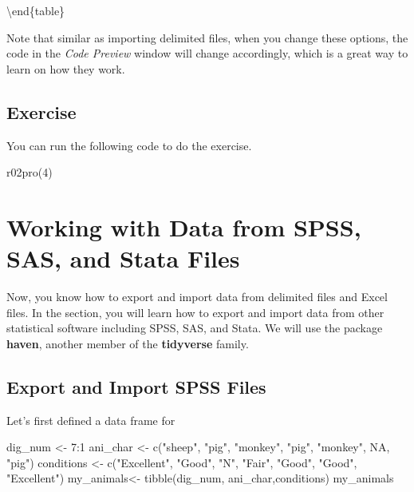 \documentclass[
]{book}
\newenvironment{Shaded}{\begin{snugshade}}{\end{snugshade}}
\newcommand{\ConstantTok}[1]{\textcolor[rgb]{0.00,0.00,0.00}{#1}}
\newcommand{\DecValTok}[1]{\textcolor[rgb]{0.00,0.00,0.81}{#1}}
\newcommand{\FunctionTok}[1]{\textcolor[rgb]{0.00,0.00,0.00}{#1}}
\newcommand{\NormalTok}[1]{#1}
\newcommand{\OtherTok}[1]{\textcolor[rgb]{0.56,0.35,0.01}{#1}}
\newcommand{\SpecialCharTok}[1]{\textcolor[rgb]{0.00,0.00,0.00}{#1}}
\newcommand{\StringTok}[1]{\textcolor[rgb]{0.31,0.60,0.02}{#1}}
\begin{document}
\textbackslash end\{table\}

Note that similar as importing delimited files, when you change these options, the code in the \emph{Code Preview} window will change accordingly, which is a great way to learn on how they work.

\hypertarget{exercise}{%
\subsection{Exercise}\label{exercise}}

You can run the following code to do the exercise.

\begin{Shaded}
\begin{Highlighting}[]
\FunctionTok{r02pro}\NormalTok{(}\DecValTok{4}\NormalTok{)}
\end{Highlighting}
\end{Shaded}

\hypertarget{import-other}{%
\section{Working with Data from SPSS, SAS, and Stata Files}\label{import-other}}

Now, you know how to export and import data from delimited files and Excel files. In the section, you will learn how to export and import data from other statistical software including SPSS, SAS, and Stata. We will use the package \textbf{haven}, another member of the \textbf{tidyverse} family.

\hypertarget{export-and-import-spss-files}{%
\subsection{Export and Import SPSS Files}\label{export-and-import-spss-files}}

Let's first defined a data frame for

\begin{Shaded}
\begin{Highlighting}[]
\NormalTok{dig\_num }\OtherTok{\textless{}{-}} \DecValTok{7}\SpecialCharTok{:}\DecValTok{1}
\NormalTok{ani\_char }\OtherTok{\textless{}{-}} \FunctionTok{c}\NormalTok{(}\StringTok{"sheep"}\NormalTok{, }\StringTok{"pig"}\NormalTok{, }\StringTok{"monkey"}\NormalTok{, }\StringTok{"pig"}\NormalTok{, }\StringTok{"monkey"}\NormalTok{, }\ConstantTok{NA}\NormalTok{, }\StringTok{"pig"}\NormalTok{)}
\NormalTok{conditions }\OtherTok{\textless{}{-}} \FunctionTok{c}\NormalTok{(}\StringTok{"Excellent"}\NormalTok{, }\StringTok{"Good"}\NormalTok{, }\StringTok{"N"}\NormalTok{, }\StringTok{"Fair"}\NormalTok{, }\StringTok{"Good"}\NormalTok{, }\StringTok{"Good"}\NormalTok{, }\StringTok{"Excellent"}\NormalTok{)}
\NormalTok{my\_animals}\OtherTok{\textless{}{-}} \FunctionTok{tibble}\NormalTok{(dig\_num, ani\_char,conditions)}
\NormalTok{my\_animals}
\end{Highlighting}
\end{Shaded}
\end{document}
